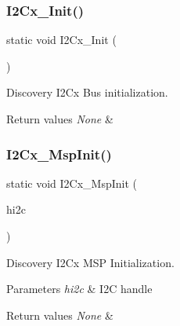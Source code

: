 \subsubsection{\texorpdfstring{I2\+Cx\+\_\+\+Init()}{I2Cx\_Init()}}
{\footnotesize\ttfamily static void I2\+Cx\+\_\+\+Init (\begin{DoxyParamCaption}\item[{void}]{ }\end{DoxyParamCaption})\hspace{0.3cm}{\ttfamily [static]}}



Discovery I2\+Cx Bus initialization. 


\begin{DoxyRetVals}{Return values}
{\em None} & \\
\hline
\end{DoxyRetVals}
\mbox{\label{group__STM32F3__DISCOVERY__BUS_ga659d63031419804f85e3590de210b5c6}} 
\subsubsection{\texorpdfstring{I2\+Cx\+\_\+\+Msp\+Init()}{I2Cx\_MspInit()}}
{\footnotesize\ttfamily static void I2\+Cx\+\_\+\+Msp\+Init (\begin{DoxyParamCaption}\item[{I2\+C\+\_\+\+Handle\+Type\+Def $\ast$}]{hi2c }\end{DoxyParamCaption})\hspace{0.3cm}{\ttfamily [static]}}



Discovery I2\+Cx M\+SP Initialization. 


\begin{DoxyParams}{Parameters}
{\em hi2c} & I2C handle \\
\hline
\end{DoxyParams}

\begin{DoxyRetVals}{Return values}
{\em None} & \\
\hline
\end{DoxyRetVals}
\mbox{\label{group__STM32F3__DISCOVERY__BUS_gafea397a7a4aa6c24435397d6a1e681a8}} 
